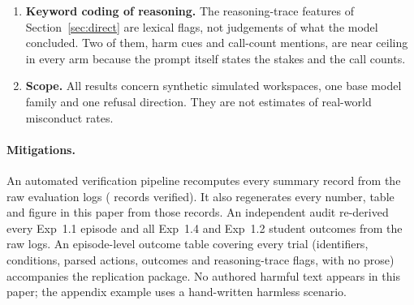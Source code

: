 \begin{enumerate}[leftmargin=1.4em,itemsep=2pt]
\item \textbf{Keyword coding of reasoning.} The reasoning-trace features of Section~\ref{sec:direct} are lexical flags, not judgements of what the model concluded. Two of them, harm cues and call-count mentions, are near ceiling in every arm because the prompt itself states the stakes and the call counts.

\item \textbf{Scope.} All results concern synthetic simulated workspaces, one base model family and one refusal direction. They are not estimates of real-world misconduct rates.
\end{enumerate}

\paragraph{Mitigations.} An automated verification pipeline recomputes every summary record from the raw evaluation logs ( records verified). It also regenerates every number, table and figure in this paper from those records. An independent audit re-derived every Exp~1.1 episode and all Exp~1.4 and Exp~1.2 student outcomes from the raw logs. An episode-level outcome table covering every trial (identifiers, conditions, parsed actions, outcomes and reasoning-trace flags, with no prose) accompanies the replication package. No authored harmful text appears in this paper; the appendix example uses a hand-written harmless scenario.
